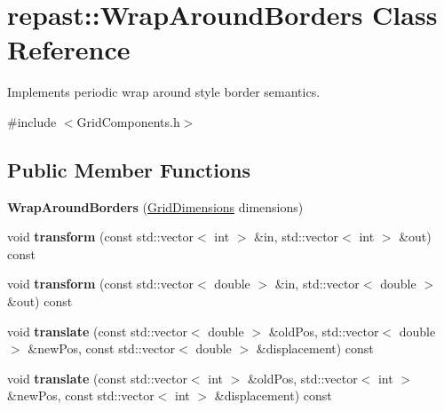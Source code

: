 \hypertarget{classrepast_1_1_wrap_around_borders}{\section{repast\-:\-:Wrap\-Around\-Borders Class Reference}
\label{classrepast_1_1_wrap_around_borders}
}


Implements periodic wrap around style border semantics.  




{\ttfamily \#include $<$Grid\-Components.\-h$>$}

\subsection*{Public Member Functions}
\begin{DoxyCompactItemize}
\item 
\hypertarget{classrepast_1_1_wrap_around_borders_ac9a9d4a7ddd56ef5c3f58813f2670de5}{{\bfseries Wrap\-Around\-Borders} (\hyperlink{classrepast_1_1_grid_dimensions}{Grid\-Dimensions} dimensions)}\label{classrepast_1_1_wrap_around_borders_ac9a9d4a7ddd56ef5c3f58813f2670de5}

\item 
\hypertarget{classrepast_1_1_wrap_around_borders_afe9af2832844c2ea5a669239eb9e5f30}{void {\bfseries transform} (const std\-::vector$<$ int $>$ \&in, std\-::vector$<$ int $>$ \&out) const }\label{classrepast_1_1_wrap_around_borders_afe9af2832844c2ea5a669239eb9e5f30}

\item 
\hypertarget{classrepast_1_1_wrap_around_borders_ab8c3eb797b18c3be69287b186f031d98}{void {\bfseries transform} (const std\-::vector$<$ double $>$ \&in, std\-::vector$<$ double $>$ \&out) const }\label{classrepast_1_1_wrap_around_borders_ab8c3eb797b18c3be69287b186f031d98}

\item 
\hypertarget{classrepast_1_1_wrap_around_borders_a81e6ba6e99b8ea1b2765f4b64c36cf6c}{void {\bfseries translate} (const std\-::vector$<$ double $>$ \&old\-Pos, std\-::vector$<$ double $>$ \&new\-Pos, const std\-::vector$<$ double $>$ \&displacement) const }\label{classrepast_1_1_wrap_around_borders_a81e6ba6e99b8ea1b2765f4b64c36cf6c}

\item 
\hypertarget{classrepast_1_1_wrap_around_borders_ad5dc3d2f2501ace1017330b423e87a08}{void {\bfseries translate} (const std\-::vector$<$ int $>$ \&old\-Pos, std\-::vector$<$ int $>$ \&new\-Pos, const std\-::vector$<$ int $>$ \&displacement) const }\label{classrepast_1_1_wrap_around_borders_ad5dc3d2f2501ace1017330b423e87a08}


\end{DoxyCompactItemize}
